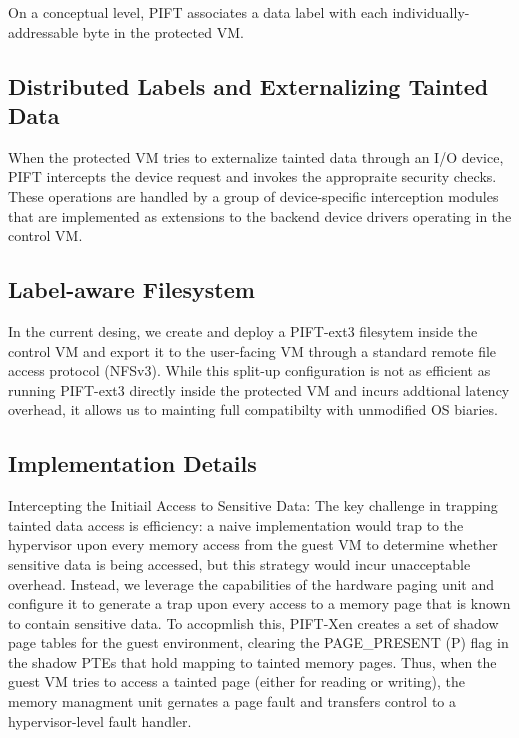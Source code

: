 On a conceptual level, PIFT associates a data label with each
individually-addressable byte in the protected VM.


\subsection{Distributed Labels and Externalizing Tainted Data}
When the protected VM tries to externalize tainted data through an I/O device,
PIFT intercepts the device request and invokes the appropraite security
checks.  These operations are handled by a group of device-specific
interception modules that are implemented as extensions to the backend
device drivers operating in the control VM.

\subsection{Label-aware Filesystem}
In the current desing, we create and deploy a PIFT-ext3 filesytem inside the
control VM and export it to the user-facing VM through a standard remote file
access protocol (NFSv3).  While this split-up configuration is not as efficient
as running PIFT-ext3 directly inside the protected VM and incurs addtional
latency overhead, it allows us to mainting full compatibilty with unmodified OS
biaries.


\subsection{Implementation Details}
Intercepting the Initiail Access to Sensitive Data:  The key challenge in
trapping tainted data access is efficiency: a naive implementation would trap to
the hypervisor upon every memory access from the guest VM to determine whether
sensitive data is being accessed, but this strategy would incur unacceptable
overhead.  Instead, we leverage the capabilities of the hardware paging unit
and configure it to generate a trap upon every access to a memory page that is
known to contain sensitive data.  To accopmlish this, PIFT-Xen creates a set of
shadow page tables for the guest environment, clearing the PAGE\_PRESENT (P)
flag in the shadow PTEs that hold mapping to tainted memory pages.  Thus, when
the guest VM tries to access a tainted page (either for reading or writing),
the memory managment unit gernates a  page fault and transfers control to a
hypervisor-level fault handler.


